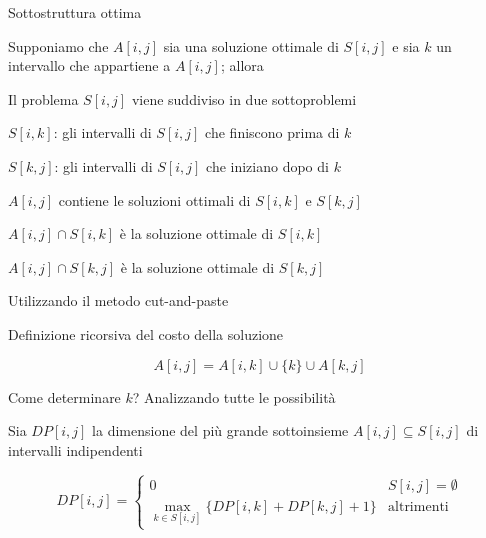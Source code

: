 \begin{frame}{Sottostruttura ottima}

Supponiamo che $A[i,j]$ sia una soluzione ottimale di $S[i,j]$ e sia $k$
un intervallo che appartiene a $A[i,j]$; allora

\BIL
\item \alert{Il problema $S[i,j]$ viene suddiviso in due sottoproblemi}
	\BI
	\item $S[i,k]$:  gli intervalli di $S[i,j]$ che finiscono prima di $k$
	\item $S[k,j]$:  gli intervalli di $S[i,j]$ che iniziano dopo di $k$
	\EI
\item \alert{$A[i,j]$ contiene le soluzioni ottimali di $S[i,k]$ e $S[k,j]$}
	\BI
	\item $A[i,j] \cap S[i,k]$ è la soluzione ottimale di $S[i,k]$
	\item $A[i,j] \cap S[k,j]$ è la soluzione ottimale di $S[k,j]$
	\EI
\EIL

Utilizzando il metodo cut-and-paste
\end{frame}

\begin{frame}{Definizione ricorsiva del costo della soluzione}

\[
	A[i,j] = A[i,k] \cup \{ k \} \cup A[k, j]
\]

\bigskip
{}
\BIL
\item Come determinare $k$? Analizzando tutte le possibilità
\item Sia $DP[i, j]$ la dimensione del
più grande sottoinsieme $A[i,j] \subseteq S[i,j]$ di intervalli indipendenti

\[
DP[i,j] = \begin{cases}
   0 & S[i,j] = \emptyset \\
	 \max_{k \in S[i,j]} \{ DP[i,k] + DP[k,j] + 1 \} & \textrm{altrimenti}
\end{cases}
\]
\EIL
\end{frame}

